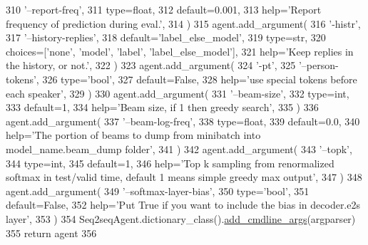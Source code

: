 \begin{DoxyCode}
310             \textcolor{stringliteral}{'--report-freq'},
311             type=float,
312             default=0.001,
313             help=\textcolor{stringliteral}{'Report frequency of prediction during eval.'},
314         )
315         agent.add\_argument(
316             \textcolor{stringliteral}{'-histr'},
317             \textcolor{stringliteral}{'--history-replies'},
318             default=\textcolor{stringliteral}{'label\_else\_model'},
319             type=str,
320             choices=[\textcolor{stringliteral}{'none'}, \textcolor{stringliteral}{'model'}, \textcolor{stringliteral}{'label'}, \textcolor{stringliteral}{'label\_else\_model'}],
321             help=\textcolor{stringliteral}{'Keep replies in the history, or not.'},
322         )
323         agent.add\_argument(
324             \textcolor{stringliteral}{'-pt'},
325             \textcolor{stringliteral}{'--person-tokens'},
326             type=\textcolor{stringliteral}{'bool'},
327             default=\textcolor{keyword}{False},
328             help=\textcolor{stringliteral}{'use special tokens before each speaker'},
329         )
330         agent.add\_argument(
331             \textcolor{stringliteral}{'--beam-size'},
332             type=int,
333             default=1,
334             help=\textcolor{stringliteral}{'Beam size, if 1 then greedy search'},
335         )
336         agent.add\_argument(
337             \textcolor{stringliteral}{'--beam-log-freq'},
338             type=float,
339             default=0.0,
340             help=\textcolor{stringliteral}{'The portion of beams to dump from minibatch into model\_name.beam\_dump folder'},
341         )
342         agent.add\_argument(
343             \textcolor{stringliteral}{'--topk'},
344             type=int,
345             default=1,
346             help=\textcolor{stringliteral}{'Top k sampling from renormalized softmax in test/valid time, default 1 means simple
       greedy max output'},
347         )
348         agent.add\_argument(
349             \textcolor{stringliteral}{'--softmax-layer-bias'},
350             type=\textcolor{stringliteral}{'bool'},
351             default=\textcolor{keyword}{False},
352             help=\textcolor{stringliteral}{'Put True if you want to include the bias in decoder.e2s layer'},
353         )
354         Seq2seqAgent.dictionary\_class().\hyperlink{namespaceparlai_1_1agents_1_1drqa_1_1config_a62fdd5554f1da6be0cba185271058320}{add\_cmdline\_args}(argparser)
355         \textcolor{keywordflow}{return} agent
356 
\end{DoxyCode}
\mbox{\label{classparlai_1_1agents_1_1legacy__agents_1_1seq2seq_1_1seq2seq__v0_1_1Seq2seqAgent_a4ae534e440fd57603bc9b6e7c08b1c57}} 
